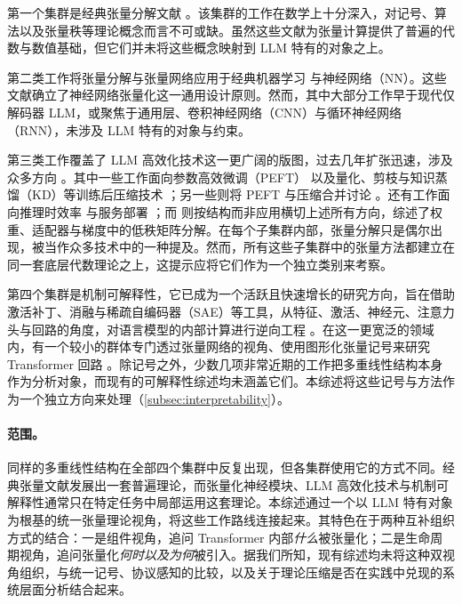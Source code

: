 \documentclass[11pt]{article}
\begin{document}
第一个集群是经典张量分解文献 \cite{kolda2009tensor, cichocki2015tensor, cichocki2015tensor2, orus2014practical}。该集群的工作在数学上十分深入，对记号、算法以及张量秩等理论概念而言不可或缺。虽然这些文献为张量计算提供了普遍的代数与数值基础，但它们并未将这些概念映射到 LLM 特有的对象之上。

第二类工作将张量分解与张量网络应用于经典机器学习 \cite{sidiropoulos2017tensorsforspandml, ji2019tensorsformlsurvey1} 与神经网络（NN）\cite{panagakis2021tensorsfornn1, xinwei2024tensorsfornn2, wang2025tnmeetnn, he2026tensorsfornn3}。这些文献确立了神经网络张量化这一通用设计原则。然而，其中大部分工作早于现代仅解码器 LLM，或聚焦于通用层、卷积神经网络（CNN）与循环神经网络（RNN），未涉及 LLM 特有的对象与约束。

第三类工作覆盖了 LLM 高效化技术这一更广阔的版图，过去几年扩张迅速，涉及众多方向 \cite{wan2024efficientllmsurvey1}。其中一些工作面向参数高效微调（PEFT）\cite{wang2025peftsurvey1} 以及量化、剪枝与知识蒸馏（KD）等训练后压缩技术 \cite{zhu2024compressionsurvey1, tang2024compressionsurvey2, wang2024compressioninferencesurvey1}；另一些则将 PEFT 与压缩合并讨论 \cite{kim2025peftcompressionsurvey1}。还有工作面向推理时效率 \cite{zhou2024efficientinferencesurvey1, yuan2024efficientinferencesurvey2, li2025kvcachesurvey1} 与服务部署 \cite{miao2025efficientservingsurvey1}；而 \cite{Laura2026lowranksurvye} 则按结构而非应用横切上述所有方向，综述了权重、适配器与梯度中的低秩矩阵分解。在每个子集群内部，张量分解只是偶尔出现，被当作众多技术中的一种提及。然而，所有这些子集群中的张量方法都建立在同一套底层代数理论之上，这提示应将它们作为一个独立类别来考察。

第四个集群是机制可解释性，它已成为一个活跃且快速增长的研究方向，旨在借助激活补丁、消融与稀疏自编码器（SAE）等工具，从特征、激活、神经元、注意力头与回路的角度，对语言模型的内部计算进行逆向工程 \cite{somvanshi2026interpretabilitysurvey1, rai2025interpretabilitysurvey2, bereska2024interpretabilitysurvey3}。在这一更宽泛的领域内，有一个较小的群体专门透过张量网络的视角、使用图形化张量记号来研究 Transformer 回路 \cite{taylor2024interpretabilitysurvey4}。除记号之外，少数几项非常近期的工作把多重线性结构本身作为分析对象，而现有的可解释性综述均未涵盖它们。本综述将这些记号与方法作为一个独立方向来处理（\cref{subsec:interpretability}）。

\paragraph{范围。} 

同样的多重线性结构在全部四个集群中反复出现，但各集群使用它的方式不同。经典张量文献发展出一套普遍理论，而张量化神经模块、LLM 高效化技术与机制可解释性通常只在特定任务中局部运用这套理论。本综述通过一个以 LLM 特有对象为根基的统一张量理论视角，将这些工作路线连接起来。其特色在于两种互补组织方式的结合：一是组件视角，追问 Transformer 内部\emph{什么}被张量化；二是生命周期视角，追问张量化\emph{何时以及为何}被引入。据我们所知，现有综述均未将这种双视角组织，与统一记号、协议感知的比较，以及关于理论压缩是否在实践中兑现的系统层面分析结合起来。
\end{document}
